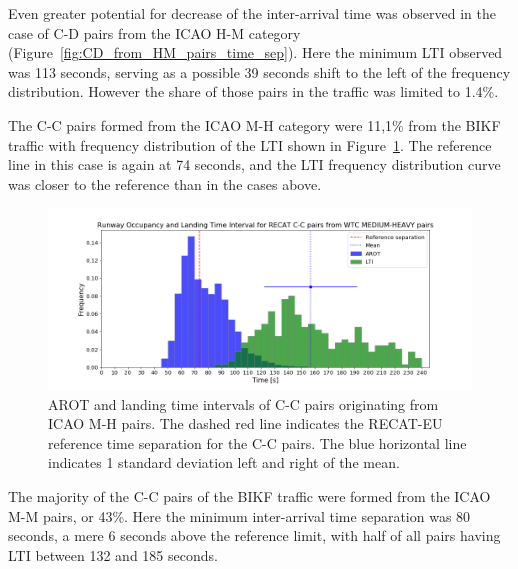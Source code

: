 Even greater potential for decrease of the inter-arrival time was observed in the case of C-D pairs from the ICAO H-M category (Figure~\ref{fig:CD_from_HM_pairs_time_sep}). Here the minimum LTI observed was 113 seconds, serving as a possible 39 seconds shift to the left of the frequency distribution. However the share of those pairs in the traffic was limited to 1.4\%.

The C-C pairs formed from the ICAO M-H category were 11,1\% from the BIKF traffic with frequency distribution of the LTI shown in Figure~\ref{fig:CC_from_MH_pairs_time_sep}. The reference line in this case is again at 74 seconds, and the LTI frequency distribution curve was closer to the reference than in the cases above.

\begin{figure}[h]
    \centering
    \includegraphics[width=1\textwidth]{graphics/fig_CC_from_MH_pairs_time_sep.png}
    \caption[AROT and LTI of C-C pairs originating from ICAO M-H pairs]{AROT and landing time intervals of C-C pairs originating from ICAO M-H pairs. The dashed red line indicates the RECAT-EU reference time separation for the C-C pairs. The blue horizontal line indicates 1 standard deviation left and right of the mean.}
    \label{fig:CC_from_MH_pairs_time_sep}
\end{figure}

The majority of the C-C pairs of the BIKF traffic were formed from the ICAO M-M pairs, or 43\%. Here the minimum inter-arrival time separation was 80 seconds, a mere 6 seconds above the reference limit, with half of all pairs having LTI between 132 and 185 seconds.

